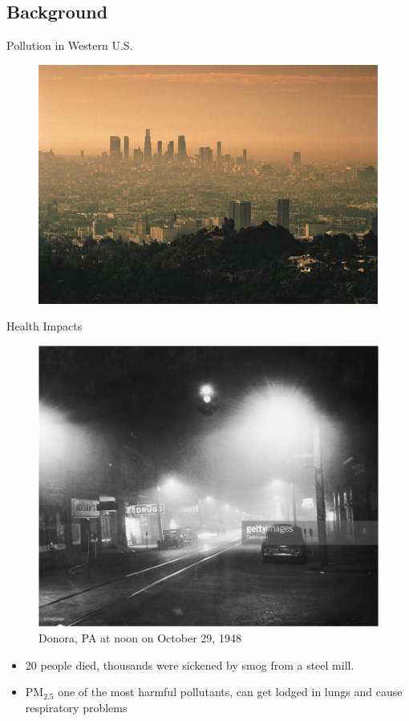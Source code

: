 \documentclass[notheorems,envcountsect,allowframebreaks,xcolor=svgnames,8pt]{beamer}
\begin{document}
\subsection*{Background}
\begin{frame}{Pollution in Western U.S.}
\begin{figure}
\centering
\includegraphics[scale=0.8]{smog}
\end{figure}
\end{frame}

\begin{frame}{Health Impacts}
\begin{figure}[H]
\centering
\includegraphics[scale=0.3]{19481029pm.png}
\caption{Donora, PA at noon on October 29, 1948}
\label{fig:locations}
\end{figure}

\begin{itemize}
\item 20 people died, thousands were sickened by smog from a steel mill.
\item PM$_{2.5}$ one of the most harmful pollutants, can get lodged in lungs and cause respiratory problems
\end{itemize}
\end{frame}
\end{document}
